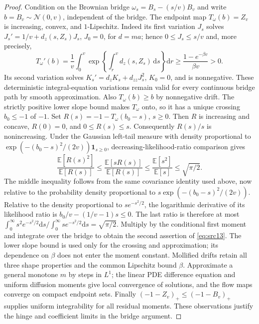 \documentclass[11pt,a4paper]{article}
\numberwithin{equation}{section}
\theoremstyle{definition}
\theoremstyle{remark}
\newcommand{\E}{\mathbb E}
\newcommand{\dd}{\mathrm d}
\newcommand{\ind}{\mathbf 1}
\newcommand{\cN}{\mathcal N}
\begin{document}
\begin{proof}
Condition on the Brownian bridge $\omega_s=B_s-(s/v)B_v$ and write
$b=B_v\sim\cN(0,v)$, independent of the bridge.  The endpoint map
$T_\omega(b)=Z_v$ is increasing, convex, and $1$-Lipschitz.  Indeed its
first variation $J_s$ solves
$J_s'=1/v+d_z(s,Z_s)J_s$, $J_0=0$, for $d=ma$; hence
$0\le J_s\le s/v$ and, more precisely,
\[
 T_\omega'(b)=\frac1v\int_0^v
       \exp\left\{\int_r^v d_z(s,Z_s)\,\dd s\right\}\dd r
 \ge\frac{1-e^{-\beta v}}{\beta v}>0.
\]
Its second variation solves
$K_s'=d_zK_s+d_{zz}J_s^2$, $K_0=0$, and is nonnegative.
These deterministic integral-equation variations remain valid for every
continuous bridge path by smooth approximation.  Also $T_\omega(b)\ge b$
by nonnegative drift.  The strictly positive lower slope bound makes
$T_\omega$ onto, so it has a unique crossing $b_0\le-1$ of $-1$.  Set
$R(s)=-1-T_\omega(b_0-s)$, $s\ge0$.  Then $R$ is increasing and
concave, $R(0)=0$, and $0\le R(s)\le s$.
Consequently $R(s)/s$ is nonincreasing.  Under the Gaussian left-tail
measure with density proportional to
$\exp(-(b_0-s)^2/(2v))\ind_{s\ge0}$, decreasing-likelihood-ratio
comparison gives
\[
 \frac{\E[R(s)^2]}{\E[R(s)]}
 \le \frac{\E[sR(s)]}{\E[R(s)]}
 \le \frac{\E[s^2]}{\E[s]}
 \le\sqrt{\pi/2}.
\]
The middle inequality follows from the same covariance identity used
above, now relative to the probability density proportional to
$s\exp(-(b_0-s)^2/(2v))$.  Relative to the density proportional to
$s e^{-s^2/2}$, the logarithmic derivative of its likelihood ratio is
$b_0/v-(1/v-1)s\le0$.  The last ratio is therefore at most
$\int_0^\infty s^2e^{-s^2/2}\dd s/\int_0^\infty se^{-s^2/2}\dd s
=\sqrt{\pi/2}$.  Multiply by the conditional first moment and integrate
over the bridge to obtain the second assertion of \eqref{eq:src13}.
The lower slope bound is used only for the crossing and approximation;
its dependence on $\beta$ does not enter the moment constant.  Mollified
drifts retain all three shape properties and the common Lipschitz bound
$\beta$.  Approximate a general monotone $m$ by steps in $L^1$; the linear
PDE difference equation and uniform diffusion moments give local
convergence of solutions, and the flow maps converge on compact endpoint
sets.  Finally $(-1-Z_v)_+\le(-1-B_v)_+$ supplies uniform integrability
for all residual moments.  These observations justify the hinge and
coefficient limits in the bridge argument.
\end{proof}
\end{document}

